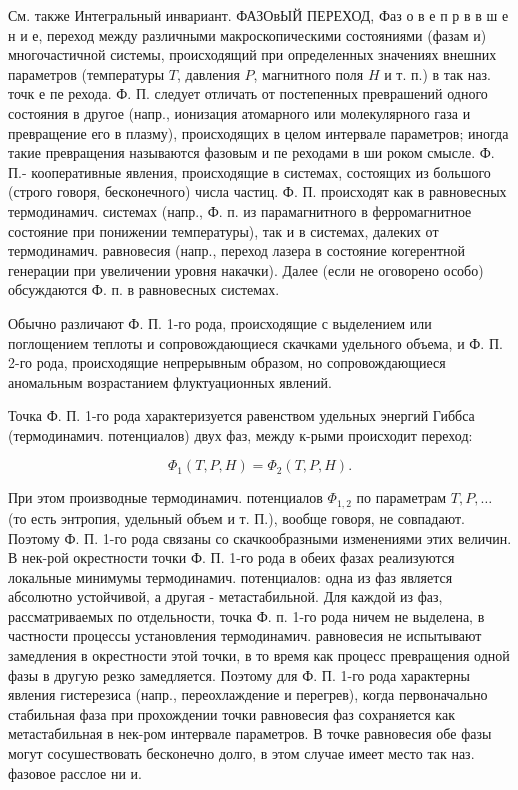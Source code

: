\documentclass[10pt]{article}
\begin{document}
См. также Интегральный инвариант. ФАЗОвЫЙ ПЕРЕХОД, Фаз о в е п р в в ш е н и е, переход между различными макроскопическими состояниями (фазам и) многочастичной системы, происходящий при определенных значениях внешних параметров (температуры $T$, давления $P$, магнитного поля $H$ и т. п.) в так наз. точк е пе рехода. Ф. П. следует отличать от постепенных преврашений одного состояния в другое (напр., ионизация атомарного или молекулярного газа и превращение его в плазму), происходящих в целом интервале параметров; иногда такие превращения называются фазовым и пе реходами в ши роком смысле. Ф. П.- кооперативные явления, происходящие в системах, состоящих из большого (строго говоря, бесконечного) числа частиц. Ф. П. происходят как в равновесных термодинамич. системах (напр., Ф. п. из парамагнитного в ферромагнитное состояние при понижении температуры), так и в системах, далеких от термодинамич. равновесия (напр., переход лазера в состояние когерентной генерации при увеличении уровня накачки). Далее (если не оговорено особо) обсуждаются Ф. п. в равновесных системах.



Обычно различают Ф. П. 1-го рода, происходящие с выделением или поглощением теплоты и сопровождающиеся скачками удельного объема, и Ф. П. 2-го рода, происходящие непрерывным образом, но сопровождающиеся аномальным возрастанием флуктуационных явлений.



Точка Ф. П. 1-го рода характеризуется равенством удельных энергий Гиббса (термодинамич. потенциалов) двух фаз, между к-рыми происходит переход:



\[

\Phi_{1}(T, P, H)=\Phi_{2}(T, P, H) .

\]



При этом производные термодинамич. потенциалов $\Phi_{1,2}$ по параметрам $T, P, \ldots$ (то есть энтропия, удельный объем и т. П.), вообще говоря, не совпадают. Поэтому Ф. П. 1-го рода связаны со скачкообразными изменениями этих величин. В нек-рой окрестности точки Ф. П. 1-го рода в обеих фазах реализуются локальные минимумы термодинамич. потенциалов: одна из фаз является абсолютно устойчивой, а другая - метастабильной. Для каждой из фаз, рассматриваемых по отдельности, точка Ф. п. 1-го рода ничем не выделена, в частности процессы установления термодинамич. равновесия не испытывают замедления в окрестности этой точки, в то время как процесс превращения одной фазы в другую резко замедляется. Поэтому для Ф. П. 1-го рода характерны явления гистерезиса (напр., переохлаждение и перегрев), когда первоначально стабильная фаза при прохождении точки равновесия фаз сохраняется как метастабильная в нек-ром интервале параметров. В точке равновесия обе фазы могут сосушествовать бесконечно долго, в этом случае имеет место так наз. фазовое расслое ни и.
\end{document}
